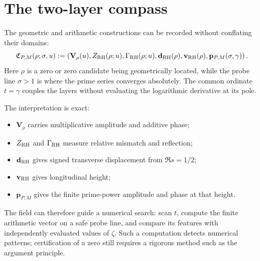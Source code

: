 \documentclass[11pt]{article}
\begin{document}
\section{The two-layer compass}
The geometric and arithmetic constructions can be recorded without conflating their domains:
\begin{equation}\label{eq:augmented-compass}
 \mathfrak C_{P,M}(\rho;\sigma,u)
 :=\left(
 \mathbf V_\rho(u),
 Z_{\rm RH}(\rho;u),
 \Gamma_{\rm RH}(\rho;u),
 \mathbf d_{\rm RH}(\rho),
 \mathbf v_{\rm RH}(\rho),
 \mathbf p_{P,M}(\sigma,\gamma)
 \right).
\end{equation}
Here $\rho$ is a zero or zero candidate being geometrically located, while the probe line
$\sigma>1$ is where the prime series converges absolutely.  The common ordinate $t=\gamma$
couples the layers without evaluating the logarithmic derivative at its pole.

The interpretation is exact:
\begin{itemize}
 \item $\mathbf V_\rho$ carries multiplicative amplitude and additive phase;
 \item $Z_{\rm RH}$ and $\Gamma_{\rm RH}$ measure relative mismatch and reflection;
 \item $\mathbf d_{\rm RH}$ gives signed transverse displacement from $\Re s=1/2$;
 \item $\mathbf v_{\rm RH}$ gives longitudinal height;
 \item $\mathbf p_{P,M}$ gives the finite prime-power amplitude and phase at that height.
\end{itemize}
The field can therefore guide a numerical search: scan $t$, compute the finite arithmetic
vector on a safe probe line, and compare its features with independently evaluated values of
$\zeta$.  Such a computation detects numerical patterns; certification of a zero still
requires a rigorous method such as the argument principle.
\end{document}
